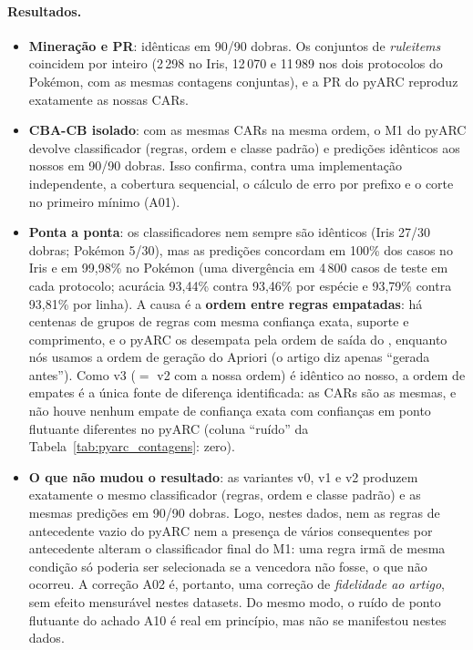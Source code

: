 \documentclass[a4paper,11pt]{article}
\newcommand{\code}[1]{\texttt{\detokenize{#1}}}
\begin{document}




\paragraph{Resultados.}
\begin{itemize}
  \item \textbf{Minera\c{c}\~ao e PR}: id\^enticas em 90/90 dobras. Os conjuntos de \emph{ruleitems} coincidem por inteiro (2\,298 no Iris, 12\,070 e 11\,989 nos dois protocolos do Pok\'emon, com as mesmas contagens conjuntas), e a PR do pyARC reproduz exatamente as nossas CARs.
  \item \textbf{CBA-CB isolado}: com as mesmas CARs na mesma ordem, o M1 do pyARC devolve classificador (regras, ordem e classe padr\~ao) e predi\c{c}\~oes id\^enticos aos nossos em 90/90 dobras. Isso confirma, contra uma implementa\c{c}\~ao independente, a cobertura sequencial, o c\'alculo de erro por prefixo e o corte no primeiro m\'inimo (A01).
  \item \textbf{Ponta a ponta}: os classificadores nem sempre s\~ao id\^enticos (Iris 27/30 dobras; Pok\'emon 5/30), mas as predi\c{c}\~oes concordam em 100\% dos casos no Iris e em 99,98\% no Pok\'emon (uma diverg\^encia em 4\,800 casos de teste em cada protocolo; acur\'acia 93,44\% contra 93,46\% por esp\'ecie e 93,79\% contra 93,81\% por linha). A causa \'e a \textbf{ordem entre regras empatadas}: h\'a centenas de grupos de regras com mesma confian\c{c}a exata, suporte e comprimento, e o pyARC os desempata pela ordem de sa\'ida do \code{pyfim}, enquanto n\'os usamos a ordem de gera\c{c}\~ao do Apriori (o artigo diz apenas ``gerada antes''). Como v3 ($=$ v2 com a nossa ordem) \'e id\^entico ao nosso, a ordem de empates \'e a \'unica fonte de diferen\c{c}a identificada: as CARs s\~ao as mesmas, e n\~ao houve nenhum empate de confian\c{c}a exata com confian\c{c}as em ponto flutuante diferentes no pyARC (coluna ``ru\'ido'' da Tabela~\ref{tab:pyarc_contagens}: zero).
  \item \textbf{O que n\~ao mudou o resultado}: as variantes v0, v1 e v2 produzem exatamente o mesmo classificador (regras, ordem e classe padr\~ao) e as mesmas predi\c{c}\~oes em 90/90 dobras. Logo, nestes dados, nem as regras de antecedente vazio do pyARC nem a presen\c{c}a de v\'arios consequentes por antecedente alteram o classificador final do M1: uma regra irm\~a de mesma condi\c{c}\~ao s\'o poderia ser selecionada se a vencedora n\~ao fosse, o que n\~ao ocorreu. A corre\c{c}\~ao A02 \'e, portanto, uma corre\c{c}\~ao de \emph{fidelidade ao artigo}, sem efeito mensur\'avel nestes datasets. Do mesmo modo, o ru\'ido de ponto flutuante do achado A10 \'e real em princ\'ipio, mas n\~ao se manifestou nestes dados.
\end{itemize}
\end{document}
